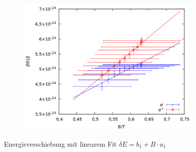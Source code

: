 \begin{figure}
\begin{subfigure}{0.6\textwidth}
\end{subfigure}
\begin{subfigure}{0.6\textwidth}
\includegraphics[width=\textwidth]{data/zeeman/out_zeeman_neu_rechts.png}
\end{subfigure}
\caption{Energieverschiebung mit linearem Fit $\delta E = b_1 + B \cdot a_1$}
\label{fig:res_lin}
\end{figure}

